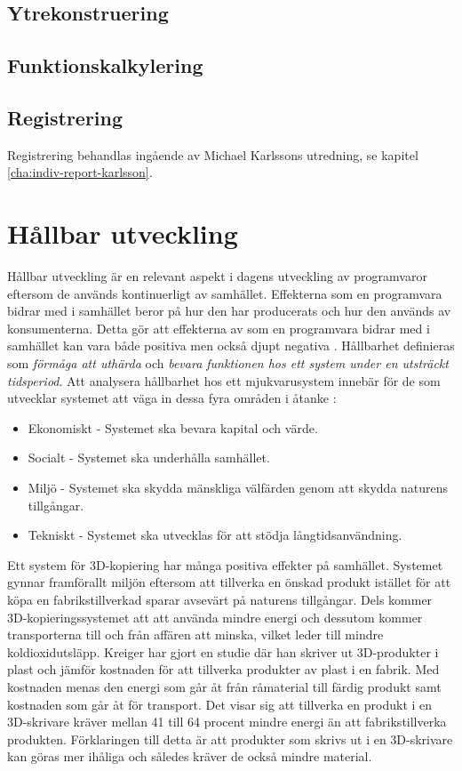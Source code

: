\subsection{Ytrekonstruering}

\subsection{Funktionskalkylering}
\subsection{Registrering}
Registrering behandlas ingående av Michael Karlssons utredning, se kapitel \ref{cha:indiv-report-karlsson}.

\section{Hållbar utveckling}
Hållbar utveckling är en relevant aspekt i dagens utveckling av programvaror eftersom de används kontinuerligt av samhället. Effekterna som en programvara bidrar med i samhället beror på hur den har producerats och hur den används av konsumenterna. Detta gör att effekterna av som en programvara bidrar med i samhället kan vara både positiva men också djupt negativa \cite{raturi2014developing}. Hållbarhet definieras som \textit{förmåga att uthärda} och \textit{bevara funktionen hos ett system under en utsträckt tidsperiod}. Att analysera hållbarhet hos ett mjukvarusystem innebär för de som utvecklar systemet att väga in dessa fyra områden i åtanke \cite{lago2015framing}:

\begin{itemize}
	\item Ekonomiskt -  Systemet ska bevara kapital och värde.
	\item Socialt - Systemet ska underhålla samhället.
	\item Miljö - Systemet ska skydda mänskliga välfärden genom att skydda naturens tillgångar.
	\item Tekniskt - Systemet ska utvecklas för att stödja långtidsanvändning.
\end{itemize}

Ett system för 3D-kopiering har många positiva effekter på samhället. Systemet gynnar framförallt miljön eftersom att tillverka en önskad produkt istället för att köpa en fabrikstillverkad sparar avsevärt på naturens tillgångar. Dels kommer 3D-kopieringssystemet att att använda mindre energi och dessutom kommer transporterna till och från affären att minska, vilket leder till mindre koldioxidutsläpp. Kreiger \cite{kreiger2013environmental} har gjort en studie där han skriver ut 3D-produkter i plast och jämför kostnaden för att tillverka produkter av plast i en fabrik. Med kostnaden menas den energi som går åt från råmaterial till färdig produkt samt kostnaden som går åt för transport. Det visar sig att tillverka en produkt i en 3D-skrivare kräver mellan 41 till 64 procent mindre energi än att fabrikstillverka produkten. Förklaringen till detta är att produkter som skrivs ut i en 3D-skrivare kan göras mer ihåliga och således kräver de också mindre material. 

